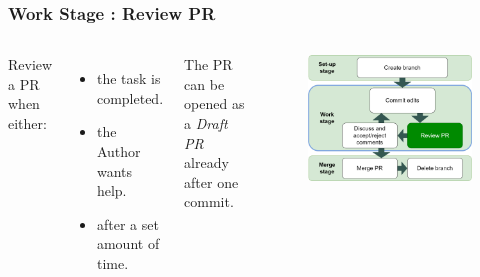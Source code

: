 \documentclass[aspectratio=169]{beamer}
\begin{document}
\begin{frame}
	\frametitle{Work Stage : Review PR}
	\begin{columns}[c]
		
		
		\normalsize
		Review a PR when either: \vspace{.3cm}
		\begin{itemize}
			\item the task is completed.
			\item the Author wants help.
			\item after a set amount of time. 
		\end{itemize}
	
		\vspace{.5cm}

		The PR can be opened as a \textit{Draft PR} already after one commit. 

		
		\vspace{-.4cm}
		\begin{figure}
			\centering
			\includegraphics[width=\textwidth]{./img/branch-pr-merge-cycle-S2b.png}
		\end{figure}
		
	\end{columns}
\end{frame}
\end{document}
